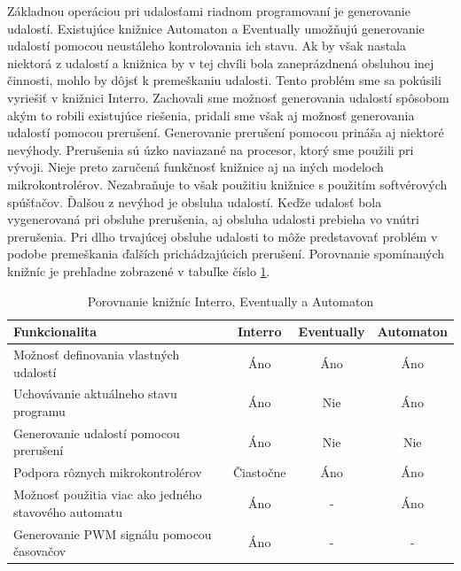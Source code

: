 Základnou operáciou pri udalosťami riadnom programovaní je generovanie udalostí. Existujúce knižnice Automaton a Eventually umožňujú generovanie udalostí pomocou
neustáleho kontrolovania ich stavu. Ak by však nastala niektorá z udalostí a knižnica by v tej chvíli bola zaneprázdnená obsluhou inej činnosti,
mohlo by dôjsť k premeškaniu udalosti. Tento problém sme sa pokúsili vyriešiť v knižnici Interro. Zachovali sme
možnosť generovania udalostí spôsobom akým to robili existujúce riešenia, pridali sme však aj možnosť generovania udalostí pomocou prerušení. Generovanie prerušení pomocou
prináša aj niektoré nevýhody. Prerušenia sú úzko naviazané na procesor, ktorý sme použili pri vývoji. Nieje preto zaručená funkčnosť knižnice aj na iných modeloch
mikrokontrolérov. Nezabraňuje to však použitiu knižnice s použitím
softvérových spúšťačov. Ďalšou z nevýhod je obsluha udalostí. Keďže udalosť bola vygenerovaná pri obsluhe prerušenia, aj obsluha udalosti prebieha vo vnútri prerušenia.
Pri dlho trvajúcej obsluhe udalosti to môže predstavovať problém v podobe premeškania ďalších prichádzajúcich prerušení.
Porovnanie spomínaných knižníc je prehľadne zobrazené v tabuľke číslo \ref{table:library-compare}.
\begin{table}[!htbp]
    \begin{center}
        \begin{tabular}{| m{20em} | c | c | c |}
            \hline
            Funkcionalita                                        & Interro   & Eventually & Automaton \\
            \hline
            Možnosť definovania vlastných udalostí               & Áno       & Áno        & Áno       \\
            \hline
            Uchovávanie aktuálneho stavu programu                & Áno       & Nie        & Áno       \\
            \hline
            Generovanie udalostí pomocou prerušení               & Áno       & Nie        & Nie       \\
            \hline
            Podpora rôznych mikrokontrolérov                     & Čiastočne & Áno        & Áno       \\
            \hline
            Možnosť použitia viac ako jedného stavového automatu & Áno       & -          & Áno       \\
            \hline
            Generovanie PWM signálu pomocou časovačov            & Áno       & -          & -         \\
            \hline
        \end{tabular}
        \caption{Porovnanie knižníc Interro, Eventually a Automaton}
        \label{table:library-compare}
    \end{center}
\end{table}

